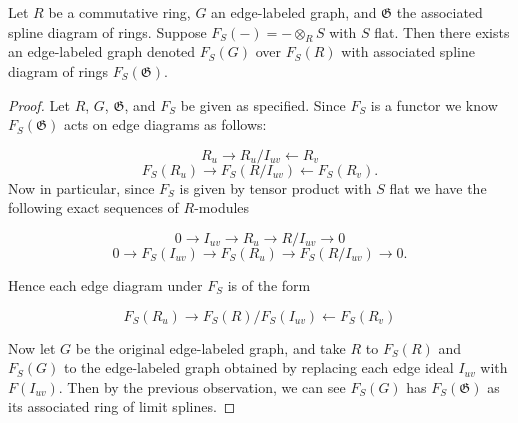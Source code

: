 \documentclass[10pt,a4paper]{amsart}
\begin{document}
\begin{lemma}
\label{lma:graph-pushforward}
Let $R$ be a commutative ring, $G$ an edge-labeled graph, and $\mathfrak G$ the associated spline diagram of rings. Suppose $F_S(-) = - \otimes_R S$ with $S$ flat. Then there exists an edge-labeled graph denoted $F_S(G)$ over $F_S(R)$ with associated spline diagram of rings $F_S(\mathfrak G)$.
\end{lemma}

\begin{proof}
Let $R$, $G$, $\mathfrak G$, and $F_S$ be given as specified. Since $F_S$ is a functor we know $F_S(\mathfrak G)$ acts on edge diagrams as follows:

\[
R_u \rightarrow R_u/I_{uv} \leftarrow R_v
\]
\[
F_S(R_u) \rightarrow F_S(R/I_{uv}) \leftarrow F_S(R_v).
\]
Now in particular, since $F_S$ is given by tensor product with $S$ flat we have the following exact sequences of $R$-modules

\[
0 \rightarrow I_{uv} \rightarrow R_u \rightarrow R/I_{uv} \rightarrow 0
\]
\[
0 \rightarrow F_S(I_{uv}) \rightarrow F_S(R_u) \rightarrow F_S(R/I_{uv}) \rightarrow 0.
\]

Hence each edge diagram under $F_S$ is of the form

\[
F_S(R_u) \rightarrow F_S(R)/F_S(I_{uv}) \leftarrow F_S(R_v) 
\]

Now let $G$ be the original edge-labeled graph, and take $R$ to $F_S(R)$ and $F_S(G)$ to the edge-labeled graph obtained by replacing each edge ideal $I_{uv}$ with $F(I_{uv})$. Then by the previous observation, we can see $F_S(G)$ has $F_S(\mathfrak G)$ as its associated ring of limit splines. 
\end{proof}
\end{document}
